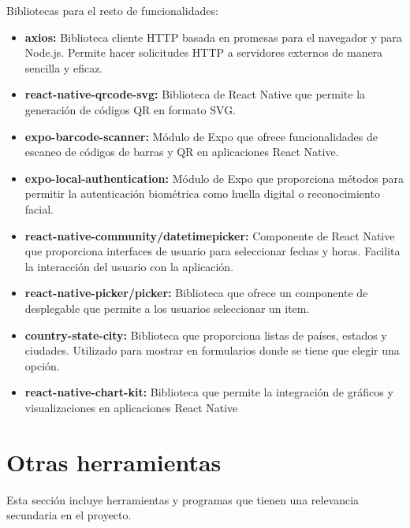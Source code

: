 Bibliotecas para el resto de funcionalidades:
\begin{itemize}

\item \textbf{axios:} Biblioteca cliente HTTP basada en promesas para el navegador y para Node.js. Permite hacer solicitudes HTTP a servidores externos de manera sencilla y eficaz.

\item \textbf{react-native-qrcode-svg:} Biblioteca de React Native que permite la generación de códigos QR en formato SVG.

\item \textbf{expo-barcode-scanner:} Módulo de Expo que ofrece funcionalidades de escaneo de códigos de barras y QR en aplicaciones React Native.

\item \textbf{expo-local-authentication:} Módulo de Expo que proporciona métodos para permitir la autenticación biométrica como huella digital o reconocimiento facial.

\item \textbf{react-native-community/datetimepicker:} Componente de React Native que proporciona interfaces de usuario para seleccionar fechas y horas.
Facilita la interacción del usuario con la aplicación.

\item \textbf{react-native-picker/picker:} Biblioteca que ofrece un componente de desplegable que permite a los usuarios seleccionar un item. 

\item \textbf{country-state-city:} Biblioteca que proporciona listas de países, estados y ciudades. Utilizado para mostrar en formularios donde se tiene que elegir una opción. 

\item \textbf{react-native-chart-kit:} Biblioteca que permite la integración de gráficos y visualizaciones en aplicaciones React Native

\end{itemize}


\section{Otras herramientas}

Esta sección incluye herramientas y programas que tienen una relevancia secundaria en el proyecto.

